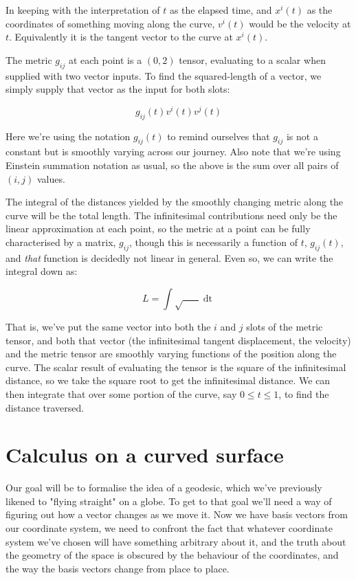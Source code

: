In keeping with the interpretation of $t$ as the elapsed time, and $x^i(t)$ as the coordinates of something moving along the curve, $v^i(t)$ would be the velocity at $t$. Equivalently it is the tangent vector to the curve at $x^i(t)$.

The metric $g_{ij}$ at each point is a $(0, 2)$ tensor, evaluating to a scalar when supplied with two vector inputs. To find the squared-length of a vector, we simply supply that vector as the input for both slots:

$$
g_{ij}(t)
 v^i(t)  
 v^j(t) 
$$

Here we're using the notation $g_{ij}(t)$ to remind ourselves that $g_{ij}$ is not a constant but is smoothly varying across our journey. Also note that we're using Einstein summation notation as usual, so the above is the sum over all pairs of $(i, j)$ values.

The integral of the distances yielded by the smoothly changing metric along the curve will be the total length. The infinitesimal contributions need only be the linear approximation at each point, so the metric at a point can be fully characterised by a matrix, $g_{ij}$, though this is necessarily a function of $t$, $g_{ij}(t)$, and \textit{that} function is decidedly not linear in general. Even so, we can write the integral down as:

$$
L =
\int
\sqrt{
    \mathop{g_{ij}(t)}
    \mathop{v^i(t)}
    \mathop{v^j(t)}
}
\mathop{dt}
$$

That is, we've put the same vector into both the $i$ and $j$ slots of the metric tensor, and both that vector (the infinitesimal tangent displacement, the velocity) and the metric tensor are smoothly varying functions of the position along the curve. The scalar result of evaluating the tensor is the square of the infinitesimal distance, so we take the square root to get the infinitesimal distance. We can then integrate that over some portion of the curve, say $0 \le t \le 1$, to find the distance traversed.

\section{Calculus on a curved surface}

Our goal will be to formalise the idea of a geodesic, which we've previously likened to "flying straight" on a globe. To get to that goal we'll need a way of figuring out how a vector changes as we move it. Now we have basis vectors from our coordinate system, we need to confront the fact that whatever coordinate system we've chosen will have something arbitrary about it, and the truth about the geometry of the space is obscured by the behaviour of the coordinates, and the way the basis vectors change from place to place.

